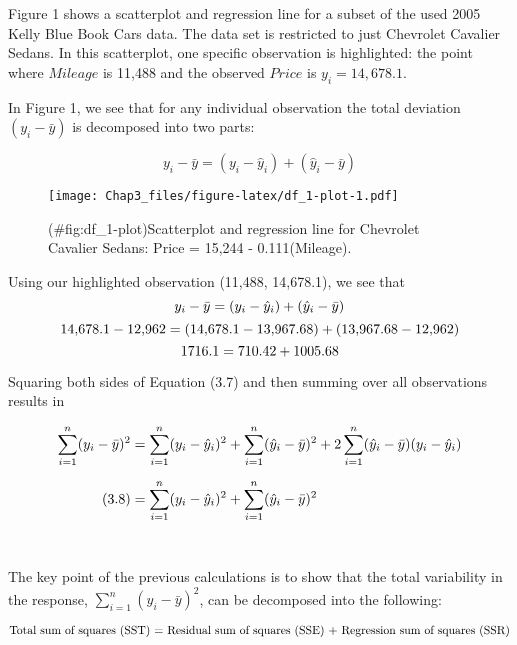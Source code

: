 \documentclass[
]{report}
\theoremstyle{definition}
\theoremstyle{definition}
\theoremstyle{definition}
\theoremstyle{definition}
\theoremstyle{remark}
\begin{document}
Figure 1 shows a scatterplot and regression line for a subset of the used 2005 Kelly Blue Book Cars data. The data set is restricted to just Chevrolet Cavalier Sedans. In this scatterplot, one specific observation is highlighted: the point where \(Mileage\) is 11,488 and the observed \(Price\) is \(y_i = 14{,}678.1\).

In Figure 1, we see that for any individual observation the total deviation \((y_i - \bar{y})\) is decomposed into two parts:

\begin{equation}
y_i - \bar{y} = (y_i - \hat{y}_i) + (\hat{y}_i - \bar{y})
\tag{3.7}
\end{equation}

\begin{figure}
\centering
\texttt{[image: Chap3\_files/figure-latex/df\_1-plot-1.pdf]}
\caption{(\#fig:df\_1-plot)Scatterplot and regression line for Chevrolet Cavalier Sedans: Price = 15,244 - 0.111(Mileage).}
\end{figure}

Using our highlighted observation (11,488, 14,678.1), we see that
\begin{equation}
y_i - \bar{y} = (y_i - \hat{y}_i) + (\hat{y}_i - \bar{y}) \notag
\end{equation}
\begin{equation}
14{,}678.1 - 12{,}962 = (14{,}678.1 - 13{,}967.68) + (13{,}967.68 - 12{,}962) \notag
\end{equation}
\begin{equation}
1716.1 = 710.42 + 1005.68 \notag
\end{equation}

Squaring both sides of Equation (3.7) and then summing over all observations results in

\begin{align}
\sum_{i=1}^n (y_i - \bar{y})^2 \notag
  &= \sum_{i=1}^n (y_i - \hat{y}_i)^2
  + \sum_{i=1}^n (\hat{y}_i - \bar{y})^2
  + 2 \sum_{i=1}^n (\hat{y}_i - \bar{y})(y_i - \hat{y}_i) \\[6pt] \tag{3.8}
  &= \sum_{i=1}^n (y_i - \hat{y}_i)^2 + \sum_{i=1}^n (\hat{y}_i - \bar{y})^2 \\[6pt] \notag
\end{align}

The key point of the previous calculations is to show that the total variability in the response, \(\sum_{i=1}^n (y_i - \bar{y})^2\), can be decomposed into the following:

\begin{equation}
\text{Total sum of squares (SST) = Residual sum of squares (SSE) + Regression sum of squares (SSR)} \notag
\end{equation}
\end{document}
